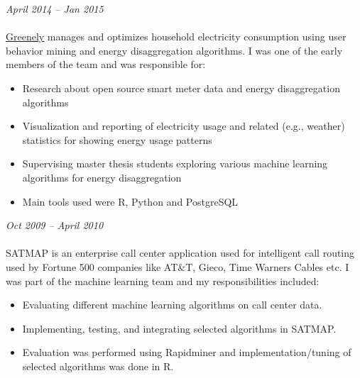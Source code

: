 \documentclass[margin, 10pt]{res} %
\begin{document}
\begin{resume}
{\sl \textbf{}} \hfill \textit{April 2014 -- Jan 2015} \\
{\color{RubineRed}{Greenely, Sweden}} \\
\href{http://www.greenely.com}{Greenely} manages and optimizes household electricity consumption using user behavior mining and energy disaggregation algorithms. I was one of the early members of the team and was responsible for:
\begin{itemize} 
\item Research about open source smart meter data and energy disaggregation algorithms
\item Visualization and reporting of electricity usage and related (e.g., weather) statistics for showing energy usage patterns
\item Supervising master thesis students exploring various machine learning algorithms for energy disaggregation 
\item Main tools used were R, Python and PostgreSQL
\end{itemize} 

{\sl {}} \hfill \textit{Oct 2009 -- April 2010} \\
{\href{http://www.satmapinc.com/}{\color{RubineRed}{Afiniti (formerly TRG SATMAP), Machine Learning Team, Pakistan}}}  \\
SATMAP is an enterprise call center application used for intelligent call routing used by Fortune 500 companies like AT\&T, Gieco, Time Warners Cables etc. I was part of the machine learning team and my responsibilities included:

\begin{itemize} \itemsep -2pt %
\item Evaluating different machine learning algorithms on call center data. 
\item Implementing, testing, and integrating selected algorithms in SATMAP. 
\item Evaluation was performed using Rapidminer and implementation/tuning of selected algorithms was done in R.
\end{itemize}


\end{resume}
\end{document}
